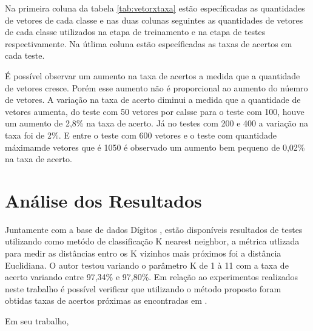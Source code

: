 Na primeira coluna da tabela \ref{tab:vetorxtaxa} estão específicadas as quantidades de vetores de cada classe e nas duas colunas seguintes as quantidades de vetores de cada classe utilizados na etapa de treinamento e na etapa de testes respectivamente. Na útlima coluna estão específicadas as taxas de acertos em cada teste. 

É possível observar um aumento na taxa de acertos a medida que a quantidade de vetores cresce. Porém esse aumento não é proporcional ao aumento do núemro de vetores. A variação na taxa de acerto diminui a medida que a quantidade de vetores aumenta, do teste com 50 vetores por calsse para o teste com 100, houve um aumento de 2,8\% na taxa de acerto. Já no testes com 200 e 400 a variação na taxa foi de 2\%. E entre o teste com 600 vetores e o teste com quantidade máximamde vetores que é 1050 é observado um aumento bem pequeno de 0,02\% na taxa de acerto.

\section{Análise dos Resultados}

Juntamente com a base de dados Dígitos \cite{Digitos}, estão disponíveis resultados de testes utilizando como metódo de classificação K nearest neighbor, a métrica utlizada para medir as distâncias entro os K vizinhos mais próximos foi a distância Euclidiana. O autor testou variando o parâmetro K de 1 à 11 com a taxa de acerto variando entre 97,34\% e 97,80\%. Em relação ao experimentos realizados neste trabalho é possível verificar que utilizando o método proposto foram obtidas taxas de acertos próximas as encontradas em .

Em seu trabalho, 


